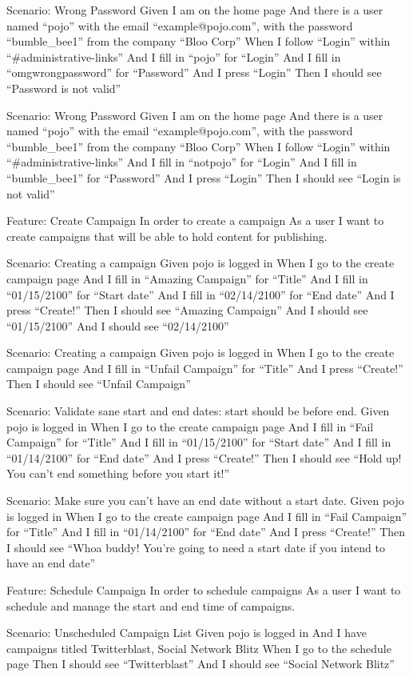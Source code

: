 \documentclass[12pt]{article}
\begin{document}
Scenario: Wrong Password
  Given I am on the home page
  And there is a user named ``pojo'' with the email ``example@pojo.com'', with the password ``bumble_bee1'' from the company ``Bloo Corp''
  When I follow ``Login'' within ``#administrative-links''
  And I fill in ``pojo'' for ``Login''
  And I fill in ``omgwrongpassword'' for ``Password''
  And I press ``Login''
  Then I should see ``Password is not valid''

Scenario: Wrong Password
  Given I am on the home page
  And there is a user named ``pojo'' with the email ``example@pojo.com'', with the password ``bumble_bee1'' from the company ``Bloo Corp''
  When I follow ``Login'' within ``#administrative-links''
  And I fill in ``notpojo'' for ``Login''
  And I fill in ``bumble_bee1'' for ``Password''
  And I press ``Login''
  Then I should see ``Login is not valid''


Feature: Create Campaign
  In order to create a campaign
  As a user
  I want to create campaigns that will be able to hold content for publishing.
  
Scenario: Creating a campaign
  Given pojo is logged in
  When I go to the create campaign page
  And I fill in ``Amazing Campaign'' for ``Title''
  And I fill in ``01/15/2100'' for ``Start date''
  And I fill in ``02/14/2100'' for ``End date''  
  And I press ``Create!''
  Then I should see ``Amazing Campaign''
  And I should see ``01/15/2100''
  And I should see ``02/14/2100''

Scenario: Creating a campaign
  Given pojo is logged in
  When I go to the create campaign page
  And I fill in ``Unfail Campaign'' for ``Title''
  And I press ``Create!''
  Then I should see ``Unfail Campaign''

Scenario: Validate sane start and end dates: start should be before end.
  Given pojo is logged in
  When I go to the create campaign page
  And I fill in ``Fail Campaign'' for ``Title''
  And I fill in ``01/15/2100'' for ``Start date''
  And I fill in ``01/14/2100'' for ``End date''
  And I press ``Create!''
  Then I should see ``Hold up! You can't end something before you start it!''

Scenario: Make sure you can't have an end date without a start date.
  Given pojo is logged in
  When I go to the create campaign page
  And I fill in ``Fail Campaign'' for ``Title''
  And I fill in ``01/14/2100'' for ``End date''
  And I press ``Create!''
  Then I should see ``Whoa buddy! You're going to need a start date if you intend to have an end date''

Feature: Schedule Campaign
  In order to schedule campaigns
  As a user
  I want to schedule and manage the start and end time of campaigns.

Scenario: Unscheduled Campaign List
  Given pojo is logged in
  And I have campaigns titled Twitterblast, Social Network Blitz
  When I go to the schedule page
  Then I should see ``Twitterblast''
  And I should see ``Social Network Blitz''
\end{document}
